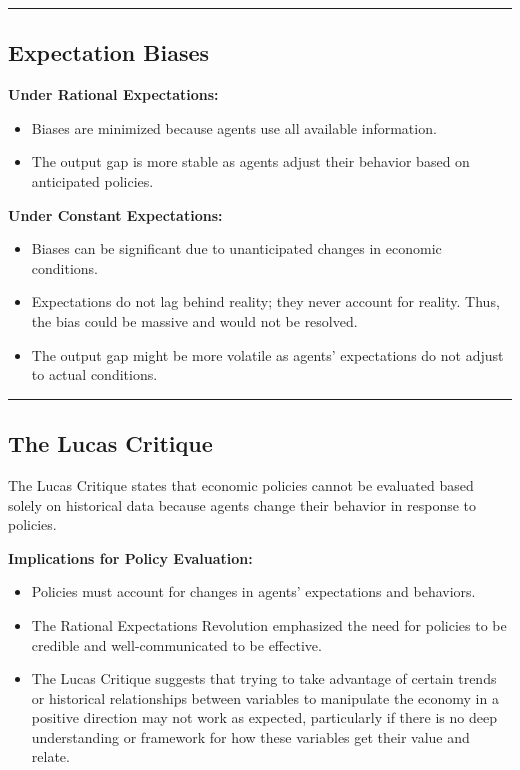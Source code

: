 \documentclass{article}
\begin{document}
\noindent\rule{\linewidth}{0.5pt}

\subsection{Expectation Biases}

\textbf{Under Rational Expectations:}
\begin{itemize}
    \item Biases are minimized because agents use all available information.
    \item The output gap is more stable as agents adjust their behavior based on anticipated policies.
\end{itemize}

\textbf{Under Constant Expectations:}
\begin{itemize}
    \item Biases can be significant due to unanticipated changes in economic conditions.
    \item Expectations do not lag behind reality; they never account for reality. Thus, the bias could be massive and would not be resolved.
    \item The output gap might be more volatile as agents' expectations do not adjust to actual conditions.
\end{itemize}

\noindent\rule{\linewidth}{0.5pt}

\subsection{The Lucas Critique}

The Lucas Critique states that economic policies cannot be evaluated based solely on historical data because agents change their behavior in response to policies.

\textbf{Implications for Policy Evaluation:}
\begin{itemize}
    \item Policies must account for changes in agents' expectations and behaviors.
    \item The Rational Expectations Revolution emphasized the need for policies to be credible and well-communicated to be effective.
    \item The Lucas Critique suggests that trying to take advantage of certain trends or historical relationships between variables to manipulate the economy in a positive direction may not work as expected, particularly if there is no deep understanding or framework for how these variables get their value and relate.
\end{itemize}
\end{document}
